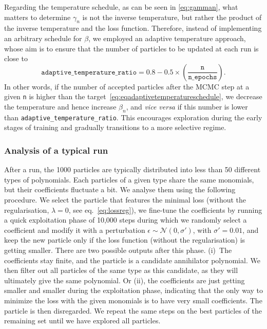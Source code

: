 \documentclass[11pt,a4paper]{article}
\begin{document}
Regarding the temperature schedule, as can be seen in \eqref{eq:gamman}, what matters to determine $\gamma_{n}$ is not the inverse temperature, but rather the product of the inverse temperature and the loss function. Therefore, instead of implementing an arbitrary schedule for $\beta$, we employed an adaptive temperature approach, whose aim is to ensure that the number of particles to be updated at each run is close to
\begin{equation} \label{eq:eqadaptivetemperatureschedule}
	\texttt{adaptive\_temperature\_ratio} = 0.8 - 0.5 \times \left(\frac{\texttt{n}}{\texttt{n\_epochs}}\right).
\end{equation}
In other words, if the number of accepted particles after the MCMC step at a given \texttt{n} is higher than the target~\eqref{eq:eqadaptivetemperatureschedule}, we decrease the temperature and hence increase $\beta_{n}$, and \textit{vice versa} if this number is lower than \texttt{adaptive\_temperature\_ratio}. This encourages exploration during the early stages of training and gradually transitions to a more selective regime.

	
	
	\subsubsection{Analysis of a typical run}\label{sec:1runanalysis}
	After a run, the 1000 particles are typically distributed into less than 50 different types of polynomials. Each particles of a given type share the same monomials, but their coefficients fluctuate a bit. We analyse them using the following procedure. We select the particle that features the minimal loss (without the regularisation, $\lambda=0$, see eq.~\eqref{eq:lossreg}), we fine-tune the coefficients by running a quick exploitation phase of 10,000 steps during which we randomly select a coefficient and modify it with a perturbation $\epsilon \sim \mathcal{N}(0, \sigma')$, with $\sigma'=0.01$, and keep the new particle only if the loss function (without the regularisation) is getting smaller. There are two possible outputs after this phase. (i)~The coefficients stay finite, and the particle is a candidate annihilator polynomial. We then filter out all  particles of the same type as this candidate, as they will ultimately give the same polynomial. Or (ii), the coefficients are just getting smaller and smaller during the exploitation phase, indicating that the only way to minimize the loss with the given monomials is to have very small coefficients. The particle is then disregarded. We repeat the same steps on the best particles of the remaining set until we have explored all particles.
\end{document}
